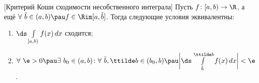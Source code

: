 [Критерий Коши сходимости несобственного интеграла]
   	Пусть $f\colon[a,b)\to \R$, а ещё $\forall\ \tilde b\in(a,b)\pau f\in\Rim[a,\tilde b]$. Тогда следующие условия эквивалентны:
   	\begin{enumerate}
   	  \item $\ds\int\limits_{[a,b)}f(x)\,dx$ сходится;
   	  \item $\forall\ \e>0\pau \exists\  b_0\in(a,b)\colon \forall\ \tilde b,\ttilde b\in(b_0,b)\pau \bigg|\ds\int\limits_{\tilde b}^{\ttilde b}f(x)\,dx\bigg|<\e$.
   	\end{enumerate}
   